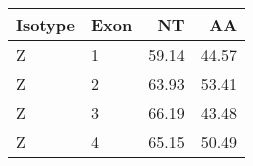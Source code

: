 \begin{tabular}{llrr}
  \toprule Isotype & Exon & NT & AA \\ 
  \midrule Z & 1 & 59.14 & 44.57 \\ 
  Z & 2 & 63.93 & 53.41 \\ 
  Z & 3 & 66.19 & 43.48 \\ 
  Z & 4 & 65.15 & 50.49 \\ 
   \bottomrule \end{tabular}
